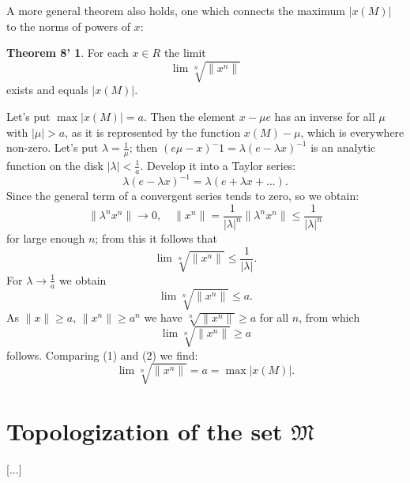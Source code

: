 \documentclass{article}
\theoremstyle{definition}
\begin{document}
A more general theorem also holds, one which connects the maximum $|x(M)|$ to the norms of powers of $x$:
\newtheorem*{theorem8'}{Theorem 8'}
\begin{theorem8'}
  For each $x\in R$ the limit $$\lim\sqrt[n]{\|x^n\|}$$ exists and equals $|x(M)|$.
\end{theorem8'}

Let's put $\max |x(M)| = a$. Then the element $x-\mu e$ has an inverse for all $\mu$ with $|\mu|>a$, as it is represented by the function $x(M)-\mu$, which is everywhere non-zero. Let's put $\lambda=\frac1\mu$; then $(e\mu-x)^-1=\lambda(e-\lambda x)^{-1}$ is an analytic function on the disk $|\lambda|<\frac1a$. Develop it into a Taylor series:
$$ \lambda(e-\lambda x)^{-1} = \lambda(e + \lambda x + ...). $$
Since the general term of a convergent series tends to zero, so we obtain:
$$ \|\lambda^n x^n\| \to 0,\quad \|x^n\| = \frac1{|\lambda|^n}\|\lambda^n x^n\| \leq \frac1{|\lambda|^n} $$
for large enough $n$; from this it follows that
$$ \lim\sqrt[n]{\|x^n\|} \leq \frac1{|\lambda|}. $$
For $\lambda \to \frac1a$ we obtain
\[ \lim\sqrt[n]{\|x^n\|} \leq a. \tag{1} \]
As $\|x\|\geq a$, $\|x^n\|\geq a^n$ we have $\sqrt[n]{\|x^n\|}\geq a$ for all $n$, from which
\[ \lim\sqrt[n]{\|x^n\|} \geq a \tag{2} \]
follows. Comparing (1) and (2) we find:
$$ \lim\sqrt[n]{\|x^n\|} = a = \max |x(M)|. $$

\section{Topologization of the set $\mathfrak{M}$}
[...]
\end{document}
